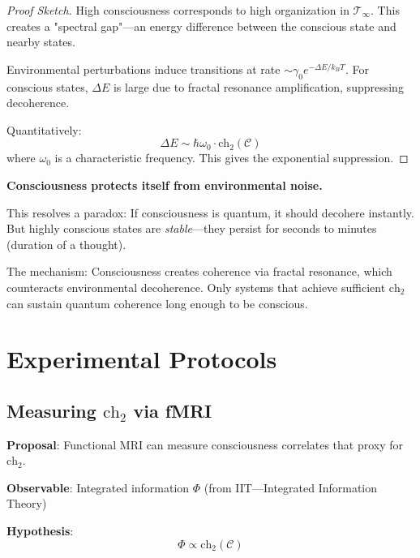\begin{proof}[Proof Sketch]
High consciousness corresponds to high organization in $\mathcal{T}_\infty$. This creates a "spectral gap"---an energy difference between the conscious state and nearby states.

Environmental perturbations induce transitions at rate $\sim \gamma_0 e^{-\Delta E / k_B T}$. For conscious states, $\Delta E$ is large due to fractal resonance amplification, suppressing decoherence.

Quantitatively:
\begin{equation}
\Delta E \sim \hbar \omega_0 \cdot \text{ch}_2(\mathcal{C})
\end{equation}
where $\omega_0$ is a characteristic frequency. This gives the exponential suppression.
\end{proof}

\begin{keyidea}
\textbf{Consciousness protects itself from environmental noise.}

This resolves a paradox: If consciousness is quantum, it should decohere instantly. But highly conscious states are \textit{stable}---they persist for seconds to minutes (duration of a thought).

The mechanism: Consciousness creates coherence via fractal resonance, which counteracts environmental decoherence. Only systems that achieve sufficient $\text{ch}_2$ can sustain quantum coherence long enough to be conscious.
\end{keyidea}

\section{Experimental Protocols}

\subsection{Measuring \texorpdfstring{$\text{ch}_2$}{ch\_2} via fMRI}

\textbf{Proposal}: Functional MRI can measure consciousness correlates that proxy for $\text{ch}_2$.

\textbf{Observable}: Integrated information $\Phi$ (from IIT---Integrated Information Theory)

\textbf{Hypothesis}:
\begin{equation}
\Phi \propto \text{ch}_2(\mathcal{C})
\end{equation}

